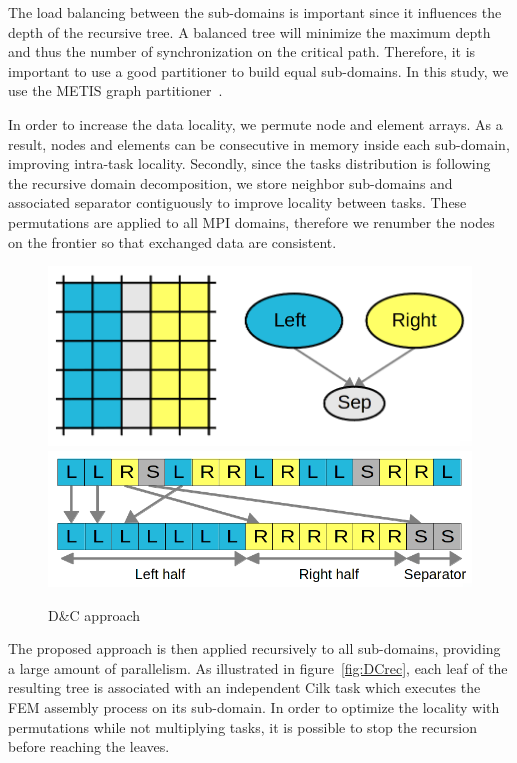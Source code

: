 \documentclass{IOS-Book-Article}
\begin{document}
The load balancing between the sub-domains is important since it influences the depth of the recursive tree.
A balanced tree will minimize the maximum depth and thus the number of synchronization on the critical path.
Therefore, it is important to use a good partitioner to build equal sub-domains. In this study, we use the METIS graph partitioner~\cite{Metis}.

In order to increase the data locality, we permute node and element arrays.
As a result, nodes and elements can be consecutive in memory inside each sub-domain, improving intra-task locality.
Secondly, since the tasks distribution is following the recursive domain decomposition, we store neighbor sub-domains and associated separator contiguously
to improve locality between tasks.
These permutations are applied to all MPI domains, therefore we renumber the nodes on the frontier so that exchanged data are consistent.
\begin{figure}[htp]
 \centering
 \includegraphics[scale=0.17]{DC_approach.png}
 \includegraphics[scale=0.21]{Data_permutations.png}
 \caption{D\&C approach}
 \label{fig:DCapp}
\end{figure}

The proposed approach is then applied recursively to all sub-domains, providing a large amount of parallelism.
As illustrated in figure~\ref{fig:DCrec}, each leaf of the resulting tree is associated with an independent Cilk task which executes the FEM assembly process on its sub-domain.
In order to optimize the locality with permutations while not multiplying tasks, it is possible to stop the recursion before reaching the leaves.
\end{document}
